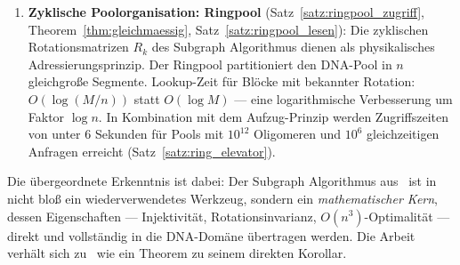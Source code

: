 ﻿\documentclass[a4paper,12pt]{article}
\theoremstyle{definition}
\theoremstyle{plain}
\begin{document}
\begin{enumerate}
  \item \textbf{Zyklische Poolorganisation: Ringpool}
        (Satz~\ref{satz:ringpool_zugriff}, Theorem~\ref{thm:gleichmaessig},
        Satz~\ref{satz:ringpool_lesen}): Die zyklischen Rotationsmatrizen
        $R_k$ des Subgraph Algorithmus dienen als physikalisches
        Adressierungsprinzip.  Der Ringpool partitioniert den DNA-Pool
        in $n$ gleichgroße Segmente.  Lookup-Zeit für Blöcke mit bekannter
        Rotation: $O(\log(M/n))$ statt $O(\log M)$ --- eine logarithmische
        Verbesserung um Faktor $\log n$.  In Kombination mit dem
        Aufzug-Prinzip werden Zugriffszeiten von unter $6$ Sekunden für
        Pools mit $10^{12}$ Oligomeren und $10^6$ gleichzeitigen Anfragen
        erreicht (Satz~\ref{satz:ring_elevator}).
\end{enumerate}

Die übergeordnete Erkenntnis ist dabei: Der Subgraph Algorithmus aus~\cite{dusgraph}
ist in~\cite{dnastor} nicht bloß ein wiederverwendetes Werkzeug, sondern
ein \emph{mathematischer Kern}, dessen Eigenschaften --- Injektivität,
Rotationsinvarianz, $O(n^3)$-Optimalität --- direkt und vollständig in
die DNA-Domäne übertragen werden.  Die Arbeit~\cite{dusgraph} verhält sich
zu~\cite{dnastor} wie ein Theorem zu seinem direkten Korollar.
\end{document}

